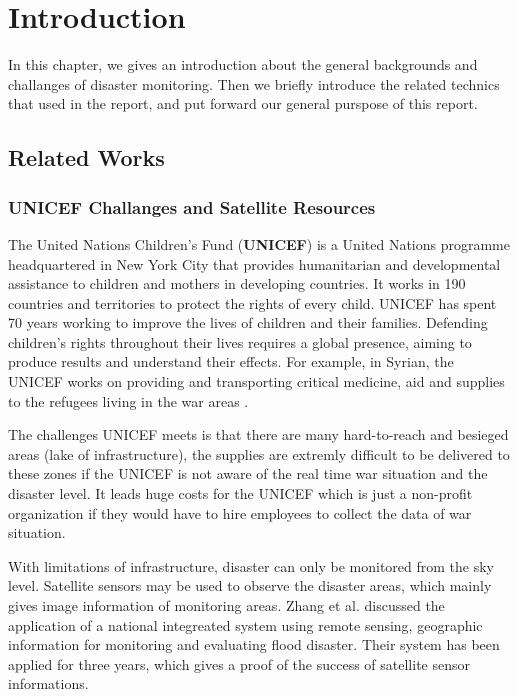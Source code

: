 \section{Introduction}

In this chapter, we gives an introduction about 
the general backgrounds and challanges of disaster monitoring. Then we briefly introduce 
the related technics that used in the report, 
and put forward our general purspose of this report.

\subsection{Related Works}

\subsubsection{UNICEF Challanges and Satellite Resources}

The United Nations Children's Fund (\textbf{UNICEF\label{idx:unicef}}) \cite{unicef1994state} 
is a United Nations programme headquartered
in New York City that provides humanitarian and developmental assistance to 
children and mothers in developing countries.
It works in 190 countries and territories to protect the rights of every child.
UNICEF has spent 70 years working to improve the lives of children and their families. 
Defending children's rights throughout their lives requires a global presence, 
aiming to produce results and understand their effects. 
For example, in Syrian, the UNICEF works on providing and transporting critical medicine, 
aid and supplies to the refugees living in the war areas \cite{unicef2017report}. 

The challenges UNICEF meets is that there are many hard-to-reach and 
besieged areas (lake of infrastructure), the supplies are extremly difficult to be delivered to these zones 
if the UNICEF is not aware of the real time war situation and the disaster level. 
It leads huge costs for the UNICEF 
which is just a non-profit organization if they would have to hire employees to collect the data of war situation.

With limitations of infrastructure, disaster can only be monitored from the sky level.
Satellite sensors may be used to observe the disaster areas, which mainly gives image information of monitoring areas. 
Zhang et al. \cite{zhang2002flood} discussed the application of a national integreated system using remote sensing, geographic information 
for monitoring and evaluating flood disaster. Their system has been applied for three years, which gives a proof of the success
of satellite sensor informations.

